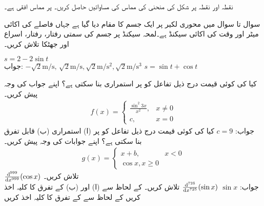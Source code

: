 نقطہ  اور نقطہ  پر شکل  کی منحنی کی مماس کی مساواتیں حاصل کریں۔  پر مماس افقی ہے۔

سوال  تا سوال  میں محوری لکیر  پر ایک جسم کا مقام  دیا گیا ہے جہاں فاصلے کی اکائی میٹر اور وقت کی اکائی سیکنڈ ہے۔لمحہ  سیکنڈ پر جسم کی سمتی رفتار، رفتار، اسراع اور جھٹکا تلاش کریں۔


$s=2-2\sin t$\\
جواب:\quad
$-\sqrt{2}\si{\meter\per\second}, \, \sqrt{2}\si{\meter\per\second}, \sqrt{2}\si{\meter\per\second\squared}, \sqrt{2}\si{\meter\per\second\cubed}$
$s=\sin t+\cos t$

کیا  کی کوئی قیمت درج ذیل تفاعل کو  پر استمراری بنا سکتی ہے؟ اپنے جواب کی وجہ پیش کریں۔
\begin{align*}
f(x)=
\begin{cases}
\tfrac{\sin^2 3x}{x^2},&x\ne 0\\
c,&x=0
\end{cases}
\end{align*}
جواب:\quad
$c=9$
کیا  کی کوئی قیمت درج ذیل تفاعل کو  پر (ا) استمراری (ب) قابل تفرق  بنا سکتی ہے؟ اپنے جوابات کی وجہ پیش کریں۔ 
\begin{align*}
g(x)=
\begin{cases}
x+b,&x<0\\
\cos x,x\ge 0
\end{cases}
\end{align*}
$\tfrac{\dif^{\,999}}{\dif x^{999}}(\cos x)$
تلاش کریں۔\\
جواب:\quad
$\sin x$
$\tfrac{\dif^{\,725}}{\dif x^{725}}(\sin x)$ 
تلاش کریں۔
 کے لحاظ سے (ا)  اور (ب)  کے تفرق کا کلیہ اخذ کریں
 کے لحاظ سے   کے تفرق کا کلیہ اخذ کریں

